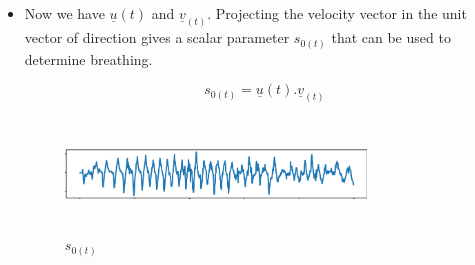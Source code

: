 \documentclass{report}
\begin{document}
\begin{itemize}
    The covariance matrix $C_{(t)}$ is calculated by,\\
    $$C_{(t)}=D_{(t)}^T .D_{(t)} $$
    
    $C_{(t)}$ is decomposed into\\
    $C_{(t)} = P_{(t)} D_{(t)} P_{(t)}^{-1}$ using eigen value decomposition.\\
    $$P_{(t)} = \left ( \begin{tabular}{cc}
         w_{1x(t)}&w_{2x(t)}  \\
         w_{1y(t)}& w_{2y(t)}
    \end{tabular}\right )$$
    and
    $$D_{(t)} = \left ( \begin{tabular}{cc}
         \lambda_{1(t)}&0  \\
         0& \lambda_{2(t)}
    \end{tabular}\right )$$
    
    Here the $P_{(t)}$ has the eigen vectors,\\
    $$\underline{w}_{1(t)}=w_{1x(t)}\underline{i}+w_{1y(t)}\underline{j}$$
    $$\underline{w}_{2(t)}=w_{2x(t)}\underline{i}+w_{2y(t)}\underline{j}$$
    
    $D_{(t)}$ has their corresponding eigen values $\lambda_{1(t)}$ and $\lambda_{2(t)}$\\
    
    The bigger value of $\lambda_{1(t)}$ and $\lambda_{2(t)}$ is chosen (let it be $\lambda_{1(t)}$ ) and the corresponsing eigen vector $\underline{w}_{1(t)}$ gives the direction of the breathing.\\
    
    The unit vector along this direction is calculated for the next steps,\\
    $$u{(t)}=\frac{\underline{w}_{1(t)}}{\|{\underline{w}_{1(t)}}\|}$$
    
    \item Now we have $\underline{u}{(t)}$ and $\underline{v}_{(t)}$. Projecting the velocity vector in the unit vector of direction gives a scalar parameter $s_{0(t)}$ that can be used to determine breathing.
    
    $$s_{0(t)}=\underline{u}{(t)} . \underline{v}_{(t)}$$
    
    \begin{figure}[H]
        \centering
        \includegraphics[width=8cm, height=3cm]{s0.png}
        \caption{$s_{0(t)}$}
        \label{fig:my_label}
    \end{figure}\\
    

\end{itemize}
\end{document}
